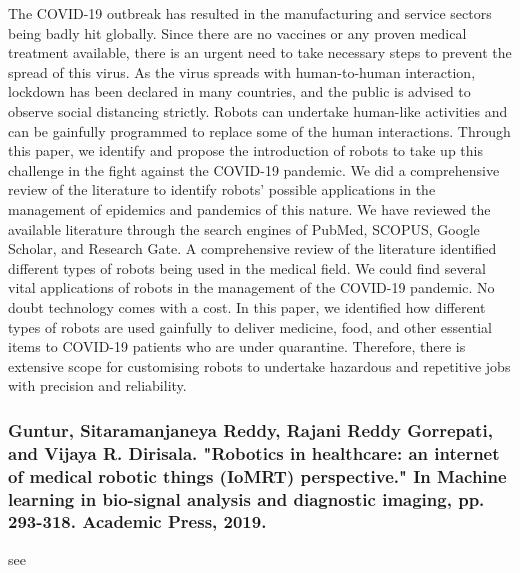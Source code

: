 \documentclass[conference]{IEEEtran}
\begin{document}
The COVID-19 outbreak has resulted in the manufacturing and service sectors being badly hit globally. Since there are no vaccines or any proven medical treatment available, there is an urgent need to take necessary steps to prevent the spread of this virus. As the virus spreads with human-to-human interaction, lockdown has been declared in many countries, and the public is advised to observe social distancing strictly. Robots can undertake human-like activities and can be gainfully programmed to replace some of the human interactions. Through this paper, we identify and propose the introduction of robots to take up this challenge in the fight against the COVID-19 pandemic. We did a comprehensive review of the literature to identify robots’ possible applications in the management of epidemics and pandemics of this nature. We have reviewed the available literature through the search engines of PubMed, SCOPUS, Google Scholar, and Research Gate. A comprehensive review of the literature identified different types of robots being used in the medical field. We could find several vital applications of robots in the management of the COVID-19 pandemic. No doubt technology comes with a cost. In this paper, we identified how different types of robots are used gainfully to deliver medicine, food, and other essential items to COVID-19 patients who are under quarantine. Therefore, there is extensive scope for customising robots to undertake hazardous and repetitive jobs with precision and reliability.

\medskip
\subsubsection{Guntur, Sitaramanjaneya Reddy, Rajani Reddy Gorrepati, and Vijaya R. Dirisala. "Robotics in healthcare: an internet of medical robotic things (IoMRT) perspective." In Machine learning in bio-signal analysis and diagnostic imaging, pp. 293-318. Academic Press, 2019.}
see \cite{guntur2019robotics}
\end{document}
